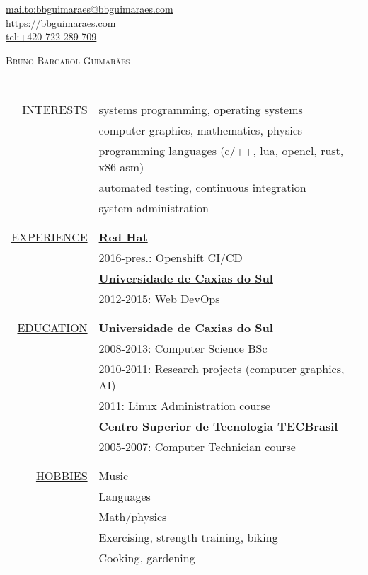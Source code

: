 \begin{flushright}
    \url{mailto:bbguimaraes@bbguimaraes.com} \\
    \url{https://bbguimaraes.com} \\
    \url{tel:+420 722 289 709}
\end{flushright}

\vspace{3\baselineskip}
{\Huge \textsc{Bruno Barcarol Guimarães}} \\
\bigskip

\begin{center}

\begin{tabular}{rl}
    \multicolumn{2}{c}{~\hspace{.95\textwidth}~} \\
    \hspace{5em}
    \hyperref[sec:projects]{\uppercase{Interests}}
    & systems programming, operating systems \\
    & computer graphics, mathematics, physics \\
    & programming languages (c/{\scriptsize++}, lua, opencl, rust, x86 asm) \\
    & automated testing, continuous integration \\
    & system administration \\
    \\ \hline \\
    \hyperref[sec:professional]{\uppercase{Experience}}
    & \hyperref[subsec:redhat]{\textbf{Red Hat}} \\
    & 2016-pres.: Openshift CI/CD \\
    & \hyperref[subsec:ucs]{\textbf{Universidade de Caxias do Sul}} \\
    & 2012-2015: Web DevOps \\
    \\ \hline \\
    \hyperref[sec:education]{\uppercase{Education}}
    & \textbf{Universidade de Caxias do Sul} \\
    & 2008-2013: Computer Science BSc \\
    & 2010-2011: Research projects (computer graphics, AI) \\
    & 2011: Linux Administration course \\
    & \textbf{Centro Superior de Tecnologia TECBrasil} \\
    & 2005-2007: Computer Technician course \\
    \\ \hline \\
    \hyperref[sec:etc]{\uppercase{Hobbies}}
    & Music \\
    & Languages \\
    & Math/physics \\
    & Exercising, strength training, biking \\
    & Cooking, gardening
\end{tabular}

\end{center}
